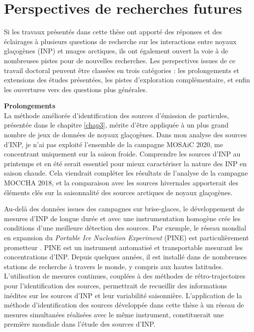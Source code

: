  
\section*{Perspectives de recherches futures}

Si les travaux présentés dans cette thèse ont apporté des réponses et des éclairages à plusieurs questions de recherche sur les interactions entre noyaux glaçogènes (INP) et nuages arctiques, ils ont également ouvert la voie à de nombreuses pistes pour de nouvelles recherches.  
Les perspectives issues de ce travail doctoral peuvent être classées en trois catégories : les prolongements et extensions des études présentées, les pistes d’exploration complémentaire, et enfin les ouvertures vers des questions plus générales.

\vspace{\baselineskip}
\textbf{Prolongements}\\
La méthode améliorée d’identification des sources d’émission de particules, présentée dans le chapitre \ref{chap3}, mérite d’être appliquée à un plus grand nombre de jeux de données de noyaux glaçogènes.  
Dans mon analyse des sources d’INP, je n’ai pas exploité l’ensemble de la campagne MOSAiC 2020, me concentrant uniquement sur la saison froide.  
Comprendre les sources d’INP au printemps et en été serait essentiel pour mieux caractériser la nature des INP en saison chaude.  
Cela viendrait compléter les résultats de l’analyse de la campagne MOCCHA 2018, et la comparaison avec les sources hivernales apporterait des éléments clés sur la saisonnalité des sources arctiques de noyaux glaçogènes.

Au-delà des données issues des campagnes sur brise-glaces, le développement de mesures d’INP de longue durée et avec une instrumentation homogène crée les conditions d’une meilleure détection des sources.  
Par exemple, le réseau mondial en expansion du \textit{Portable Ice Nucleation Experiment} (PINE) est particulièrement prometteur \citep{mohler_portable_2021}.  
PINE est un instrument automatisé et transportable mesurant les concentrations d’INP. Depuis quelques années, il est installé dans de nombreuses stations de recherche à travers le monde, y compris aux hautes latitudes.  
L’utilisation de mesures continues, couplées à des méthodes de rétro-trajectoires pour l’identification des sources, permettrait de recueillir des informations inédites sur les sources d’INP et leur variabilité saisonnière.  
L’application de la méthode d'identification des sources développée dans cette thèse à un réseau de mesures simultanées réalisées avec le même instrument, constituerait une première mondiale dans l’étude des sources d’INP.

